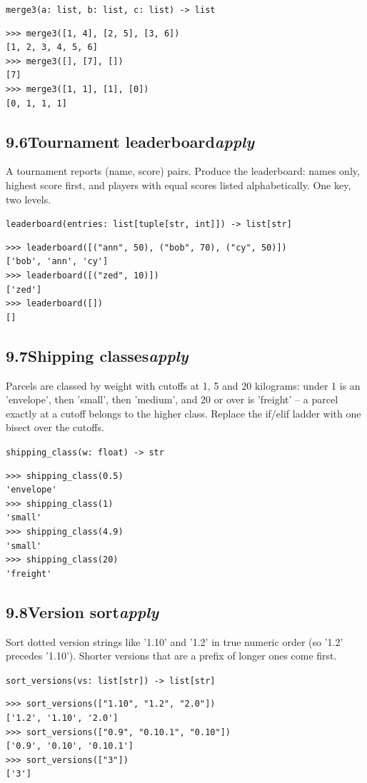 \documentclass[10pt,letterpaper]{book}
\begin{document}
\noindent\texttt{merge3(a: list, b: list, c: list) -> list}
\begin{lstlisting}[style=ex]
>>> merge3([1, 4], [2, 5], [3, 6])
[1, 2, 3, 4, 5, 6]
>>> merge3([], [7], [])
[7]
>>> merge3([1, 1], [1], [0])
[0, 1, 1, 1]
\end{lstlisting}
\subsection*{9.6\quad Tournament leaderboard\hfill\textnormal{\textit{apply}}}
A tournament reports (name, score) pairs. Produce the leaderboard: names only, highest score first, and players with equal scores listed alphabetically. One key, two levels.

\noindent\texttt{leaderboard(entries: list[tuple[str, int]]) -> list[str]}
\begin{lstlisting}[style=ex]
>>> leaderboard([("ann", 50), ("bob", 70), ("cy", 50)])
['bob', 'ann', 'cy']
>>> leaderboard([("zed", 10)])
['zed']
>>> leaderboard([])
[]
\end{lstlisting}
\subsection*{9.7\quad Shipping classes\hfill\textnormal{\textit{apply}}}
Parcels are classed by weight with cutoffs at 1, 5 and 20 kilograms: under 1 is an 'envelope', then 'small', then 'medium', and 20 or over is 'freight' -- a parcel exactly at a cutoff belongs to the higher class. Replace the if/elif ladder with one bisect over the cutoffs.

\noindent\texttt{shipping\_class(w: float) -> str}
\begin{lstlisting}[style=ex]
>>> shipping_class(0.5)
'envelope'
>>> shipping_class(1)
'small'
>>> shipping_class(4.9)
'small'
>>> shipping_class(20)
'freight'
\end{lstlisting}
\subsection*{9.8\quad Version sort\hfill\textnormal{\textit{apply}}}
Sort dotted version strings like '1.10' and '1.2' in true numeric order (so '1.2' precedes '1.10'). Shorter versions that are a prefix of longer ones come first.

\noindent\texttt{sort\_versions(vs: list[str]) -> list[str]}
\begin{lstlisting}[style=ex]
>>> sort_versions(["1.10", "1.2", "2.0"])
['1.2', '1.10', '2.0']
>>> sort_versions(["0.9", "0.10.1", "0.10"])
['0.9', '0.10', '0.10.1']
>>> sort_versions(["3"])
['3']
\end{lstlisting}
\end{document}
